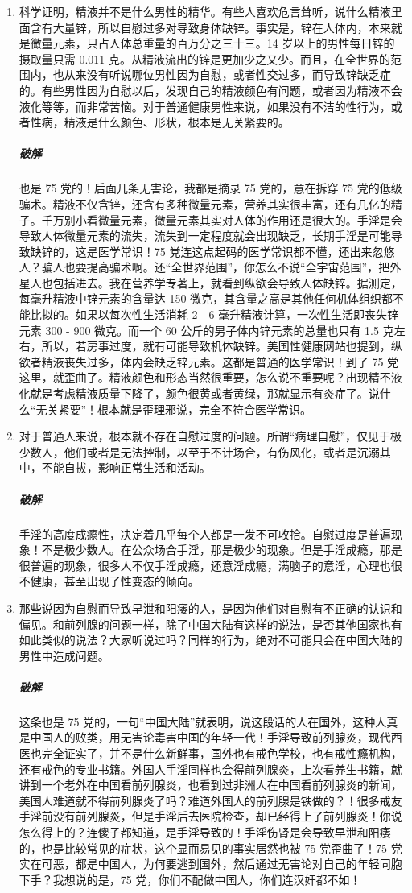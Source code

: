 \documentclass{ctexart}
\begin{document}
\begin{enumerate}
    \item 科学证明，精液并不是什么男性的精华。有些人喜欢危言耸听，说什么精液里面含有大量锌，所以自慰过多对导致身体缺锌。事实是，锌在人体内，本来就是微量元素，只占人体总重量的百万分之三十三。14 岁以上的男性每日锌的摄取量只需 0.011 克。从精液流出的锌是更加少之又少。而且，在全世界的范围内，也从来没有听说哪位男性因为自慰，或者性交过多，而导致锌缺乏症的。有些男性因为自慰以后，发现自己的精液颜色有问题，或者因为精液不会液化等等，而非常苦恼。对于普通健康男性来说，如果没有不洁的性行为，或者性病，精液是什么颜色、形状，根本是无关紧要的。
    \subparagraph{破解} 也是 75 党的！后面几条无害论，我都是摘录 75 党的，意在拆穿 75 党的低级骗术。精液不仅含锌，还含有多种微量元素，营养其实很丰富，还有几亿的精子。千万别小看微量元素，微量元素其实对人体的作用还是很大的。手淫是会导致人体微量元素的流失，流失到一定程度就会出现缺乏，长期手淫是可能导致缺锌的，这是医学常识！75 党连这点起码的医学常识都不懂，还出来忽悠人？骗人也要提高骗术啊。还“全世界范围”，你怎么不说“全宇宙范围”，把外星人也包括进去。我在营养学专著上，就看到纵欲会导致人体缺锌。据测定，每毫升精液中锌元素的含量达 150 微克，其含量之高是其他任何机体组织都不能比拟的。如果以每次性生活消耗 2 - 6 毫升精液计算，一次性生活即丧失锌元素 300 - 900 微克。而一个 60 公斤的男子体内锌元素的总量也只有 1.5 克左右，所以，若房事过度，就有可能导致机体缺锌。美国性健康网站也提到，纵欲者精液丧失过多，体内会缺乏锌元素。这都是普通的医学常识！到了 75 党这里，就歪曲了。精液颜色和形态当然很重要，怎么说不重要呢？出现精不液化就是考虑精液质量下降了，颜色很黄或者黄绿，那就显示有炎症了。说什么“无关紧要”！根本就是歪理邪说，完全不符合医学常识。
    \item 对于普通人来说，根本就不存在自慰过度的问题。所谓“病理自慰”，仅见于极少数人，他们或者是无法控制，以至于不计场合，有伤风化，或者是沉溺其中，不能自拔，影响正常生活和活动。
    \subparagraph{破解} 手淫的高度成瘾性，决定着几乎每个人都是一发不可收拾。自慰过度是普遍现象！不是极少数人。在公众场合手淫，那是极少的现象。但是手淫成瘾，那是很普遍的现象，很多人不仅手淫成瘾，还意淫成瘾，满脑子的意淫，心理也很不健康，甚至出现了性变态的倾向。
    \item 那些说因为自慰而导致早泄和阳痿的人，是因为他们对自慰有不正确的认识和偏见。和前列腺的问题一样，除了中国大陆有这样的说法，是否其他国家也有如此类似的说法？大家听说过吗？同样的行为，绝对不可能只会在中国大陆的男性中造成问题。
    \subparagraph{破解} 这条也是 75 党的，一句“中国大陆”就表明，说这段话的人在国外，这种人真是中国人的败类，用无害论毒害中国的年轻一代！手淫导致前列腺炎，现代西医也完全证实了，并不是什么新鲜事，国外也有戒色学校，也有戒性瘾机构，还有戒色的专业书籍。外国人手淫同样也会得前列腺炎，上次看养生书籍，就讲到一个老外在中国看前列腺炎，也看到过非洲人在中国看前列腺炎的新闻，美国人难道就不得前列腺炎了吗？难道外国人的前列腺是铁做的？！很多戒友手淫前没有前列腺炎，但是手淫后去医院检查，却已经得上了前列腺炎！你说怎么得上的？连傻子都知道，是手淫导致的！手淫伤肾是会导致早泄和阳痿的，也是比较常见的症状，这个显而易见的事实居然也被 75 党歪曲了！75 党实在可恶，都是中国人，为何要逃到国外，然后通过无害论对自己的年轻同胞下手？我想说的是，75 党，你们不配做中国人，你们连汉奸都不如！
\end{enumerate}
\end{document}
